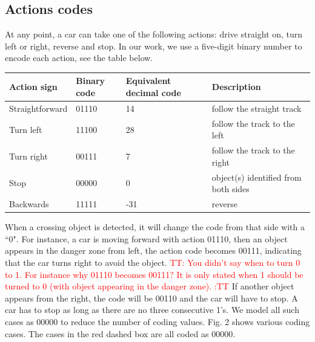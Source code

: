 \documentclass{svproc}
\renewcommand{\tt}[1]{\textcolor{red} {TT: #1 :TT} }
\begin{document}
	\subsection{Actions codes} \label{sec:action}
	At any point, a car can take one of the following actions: drive straight on, turn left or right, reverse and stop. In our work, we use a five-digit binary number to encode each action, see the table below. %
	\vspace{-0.5cm}
	\begin{center}	\begin{tabular}{|C{2.5cm}|C{1.3cm}|C{2.5cm}|C{5.5cm}|}
			\hline
			\textbf{Action sign} & \textbf{Binary code} & \textbf{Equivalent decimal code} & \textbf{Description} \\ \hline
			Straightforward	& 01110	& 14 & follow the straight track\\ \hline
			Turn left	& 11100 & 28 & follow the track to the left \\ \hline
			Turn right	& 00111 & 7 & follow the track to the right \\ \hline
			Stop& 00000 & 0 & object(s) identified from both sides\\ \hline
			Backwards& 11111 & -31 & reverse \\ \hline
		\end{tabular}
	\end{center}
	When a crossing object is detected, it will change the code from that side with a ``0". For instance, a car is moving forward with action 01110, then an object appears in the danger zone from left, the action code becomes 00111, indicating that the car turns right to avoid the object. \tt{You didn't say when to turn 0 to 1. For instance why 01110 becomes 00111? It is only stated when 1 should be turned to 0 (with object appearing in the danger zone).}If another object appears from the right, the code will be 00110 and the car will have to stop. A car has to stop as long as there are no three consecutive 1's. We model all such cases as 00000 to reduce the number of coding values. Fig. 2 shows various coding cases. The cases in the red dashed box are all coded as 00000.
	
\end{document}
